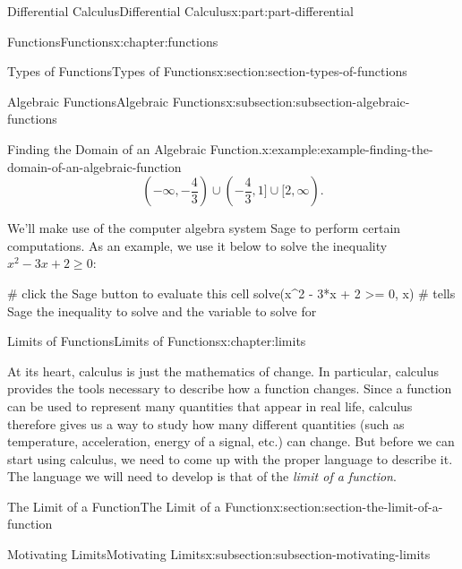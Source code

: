 \documentclass[twoside,10pt,]{book}
\numberwithin{equation}{part}
\begin{document}
\begin{partptx}{Differential Calculus}{}{Differential Calculus}{}{}{x:part:part-differential}
\begin{chapterptx}{Functions}{}{Functions}{}{}{x:chapter:functions}
\begin{sectionptx}{Types of Functions}{}{Types of Functions}{}{}{x:section:section-types-of-functions}
\begin{subsectionptx}{Algebraic Functions}{}{Algebraic Functions}{}{}{x:subsection:subsection-algebraic-functions}
\begin{example}{Finding the Domain of an Algebraic Function.}{x:example:example-finding-the-domain-of-an-algebraic-function}
\begin{equation*}
(-\infty, -\frac{4}{3})\cup (-\frac{4}{3}, 1]\cup[2,\infty)\text{.}
\end{equation*}
%
\end{example}
We'll make use of the computer algebra system Sage to perform certain computations. As an example, we use it below to solve the inequality \(x^{2} - 3x + 2 \geq 0\):%
\begin{sageinput}
# click the Sage button to evaluate this cell
solve(x^2 - 3*x + 2 >= 0, x)    # tells Sage the inequality to solve and the variable to solve for
\end{sageinput}
\end{subsectionptx}
\end{sectionptx}
\end{chapterptx}
%
\typeout{************************************************}
\typeout{************************************************}
%
\begin{chapterptx}{Limits of Functions}{}{Limits of Functions}{}{}{x:chapter:limits}
\begin{introduction}{}%
At its heart, calculus is just the mathematics of change. In particular, calculus provides the tools necessary to describe how a function changes. Since a function can be used to represent many quantities that appear in real life, calculus therefore gives us a way to study how many different quantities (such as temperature, acceleration, energy of a signal, etc.) can change. But before we can start using calculus, we need to come up with the proper language to describe it. The language we will need to develop is that of the \emph{limit of a function}.%
\end{introduction}%
%
%
\typeout{************************************************}
\typeout{************************************************}
%
\begin{sectionptx}{The Limit of a Function}{}{The Limit of a Function}{}{}{x:section:section-the-limit-of-a-function}
%
%
\typeout{************************************************}
\typeout{************************************************}
%
\begin{subsectionptx}{Motivating Limits}{}{Motivating Limits}{}{}{x:subsection:subsection-motivating-limits}

\end{subsectionptx}
\end{sectionptx}
\end{chapterptx}
\end{partptx}
\end{document}
